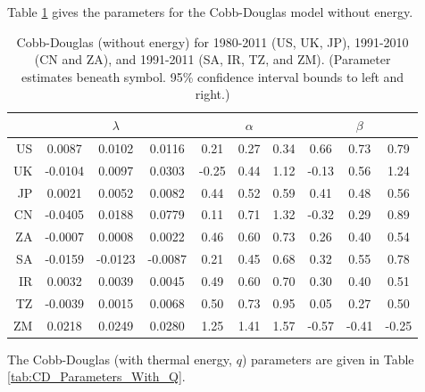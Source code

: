 \documentclass[preprint,authoryear,12pt]{elsarticle}\usepackage{graphicx, color}
\begin{document}
Table \ref{tab:CD_Parameters_No_Energy} gives the parameters for the Cobb-Douglas model without energy.

\begin{table}[H]
\begin{center}
\caption{Cobb-Douglas (without energy) for 1980-2011 (US, UK, JP), 1991-2010 (CN and ZA), and 1991-2011 (SA, IR, TZ, and ZM). (Parameter estimates beneath symbol. 95\% confidence interval bounds to left and right.)}
\label{tab:CD_Parameters_No_Energy}
{\tiny
\begin{tabular}{r|ccc|ccc|ccc}
  \hline
 &   & $\lambda$ &   &   & $\alpha$ &   &   & $\beta$ &   \\ 
  \hline
US & 0.0087 & 0.0102 & 0.0116 & 0.21 & 0.27 & 0.34 & 0.66 & 0.73 & 0.79 \\ 
  UK & -0.0104 & 0.0097 & 0.0303 & -0.25 & 0.44 & 1.12 & -0.13 & 0.56 & 1.24 \\ 
  JP & 0.0021 & 0.0052 & 0.0082 & 0.44 & 0.52 & 0.59 & 0.41 & 0.48 & 0.56 \\ 
  CN & -0.0405 & 0.0188 & 0.0779 & 0.11 & 0.71 & 1.32 & -0.32 & 0.29 & 0.89 \\ 
  ZA & -0.0007 & 0.0008 & 0.0022 & 0.46 & 0.60 & 0.73 & 0.26 & 0.40 & 0.54 \\ 
  SA & -0.0159 & -0.0123 & -0.0087 & 0.21 & 0.45 & 0.68 & 0.32 & 0.55 & 0.78 \\ 
  IR & 0.0032 & 0.0039 & 0.0045 & 0.49 & 0.60 & 0.70 & 0.30 & 0.40 & 0.51 \\ 
  TZ & -0.0039 & 0.0015 & 0.0068 & 0.50 & 0.73 & 0.95 & 0.05 & 0.27 & 0.50 \\ 
  ZM & 0.0218 & 0.0249 & 0.0280 & 1.25 & 1.41 & 1.57 & -0.57 & -0.41 & -0.25 \\ 
   \hline
\end{tabular}
}
\end{center}
\end{table}



The Cobb-Douglas (with thermal energy, $q$) parameters are given in Table \ref{tab:CD_Parameters_With_Q}.
\end{document}
